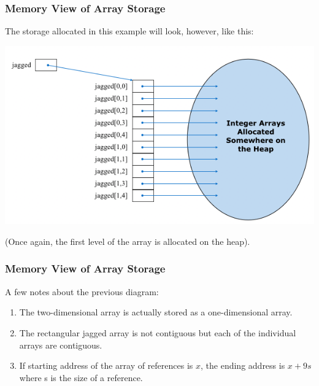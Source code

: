 \begin{frame}
\frametitle{Memory View of Array Storage}
The storage allocated in this example will look, however, like this:

\begin{center}
\includegraphics[width=\textwidth]{images/jaggedmem.png}
\end{center}

(Once again, the first level of the array is allocated on the heap).

\end{frame}


\begin{frame}
\frametitle{Memory View of Array Storage}
A few notes about the previous diagram:
\begin{enumerate}
\item The two-dimensional array is actually stored as a one-dimensional array.
\item The rectangular jagged array is not contiguous but each of the individual arrays are contiguous.
\item If starting address of the array of references is $x$, the ending address is $x + 9s$ where s is the size of a reference.
\end{enumerate}

\end{frame}

